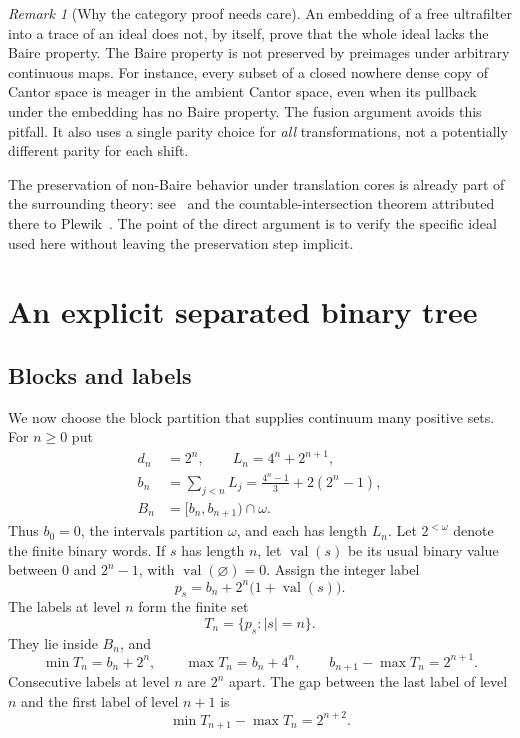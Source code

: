 \documentclass[11pt,a4paper]{article}
\theoremstyle{definition}
\theoremstyle{remark}
\newtheorem{remark}[theorem]{Remark}
\DeclareMathOperator{\val}{val}
\begin{document}
\begin{remark}[Why the category proof needs care]
An embedding of a free ultrafilter into a trace of an ideal does not, by
itself, prove that the whole ideal lacks the Baire property. The Baire
property is not preserved by preimages under arbitrary continuous maps.
For instance, every subset of a closed nowhere dense copy of Cantor
space is meager in the ambient Cantor space, even when its pullback
under the embedding has no Baire property. The fusion argument avoids
this pitfall. It also uses a single parity choice for \emph{all}
transformations, not a potentially different parity for each shift.
\end{remark}

The preservation of non-Baire behavior under translation cores is
already part of the surrounding theory: see~\cite[Proposition~3.8]{FT}
and the countable-intersection theorem attributed there to
Plewik~\cite{Plewik}. The point of the direct argument is to verify the
specific ideal used here without leaving the preservation step implicit.

\section{An explicit separated binary tree}
\label{sec:tree}

\subsection{Blocks and labels}
We now choose the block partition that supplies continuum many positive
sets. For $n\ge0$ put
\begin{equation}
\label{eq:blocks}
\begin{aligned}
 d_n&=2^n,\qquad L_n=4^n+2^{n+1},\\
 b_n&=\sum_{j<n}L_j=\frac{4^n-1}{3}+2(2^n-1),\\
 B_n&=[b_n,b_{n+1})\cap\omega.
\end{aligned}
\end{equation}
Thus $b_0=0$, the intervals partition $\omega$, and each has length
$L_n$. Let $2^{<\omega}$ denote the finite binary words. If $s$ has
length $n$, let $\val(s)$ be its usual binary value between $0$ and
$2^n-1$, with $\val(\varnothing)=0$. Assign the integer label
\begin{equation}
\label{eq:label}
                  p_s=b_n+2^n\bigl(1+\val(s)\bigr).
\end{equation}
The labels at level $n$ form the finite set
\[
                   T_n=\{p_s:|s|=n\}.
\]
They lie inside $B_n$, and
\begin{equation}
\label{eq:margins}
 \min T_n=b_n+2^n,\qquad
 \max T_n=b_n+4^n,\qquad
 b_{n+1}-\max T_n=2^{n+1}.
\end{equation}
Consecutive labels at level $n$ are $2^n$ apart. The gap between the last
label of level $n$ and the first label of level $n+1$ is
\begin{equation}
\label{eq:levelgap}
                     \min T_{n+1}-\max T_n=2^{n+2}.
\end{equation}
\end{document}
